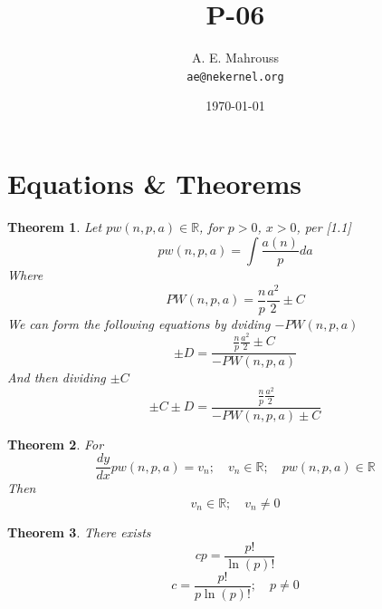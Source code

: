 \documentclass[11pt, a4paper]{article}
\title{P-06}
\author{A. E. Mahrouss\\\texttt{ae@nekernel.org}}
\date{\today}
\theoremstyle{plain}
\newtheorem{theorem}{Theorem}[section]
\theoremstyle{definition}
\theoremstyle{remark}
\begin{document}
\twocolumn[{%
  \maketitle
  \vspace{-0.5em}
  \vspace{0.8em}
  \rule{\linewidth}{0.4pt}
  \vspace{1em}
}]

\maketitle

\section{Equations \& Theorems}

\begin{theorem}
  Let $pw(n, p, a) \in \mathbb{R}$, for $p > 0$, $x > 0$, per [1.1]
  \begin{equation}
    pw(n, p, a) = \int \frac{a(n)}{p} da
  \end{equation}
  Where
  \begin{equation}
    PW(n, p, a) = \frac{n}{p} \frac{a^2}{2}\pm C
  \end{equation}
  We can form the following equations by dviding $-PW(n, p, a)$
  \begin{equation}
    \pm D = \frac{\frac{n}{p} \frac{a^2}{2}\pm C}{-PW(n, p, a)}
  \end{equation}
  And then dividing $\pm C$
  \begin{equation}
    \pm C \pm D = \frac{\frac{n}{p} \frac{a^2}{2}}{-PW(n, p, a)\pm C}
  \end{equation}
\end{theorem}

\begin{theorem}
  For
  \begin{equation}
    \frac{dy}{dx}pw(n, p, a) = v_{n}; \quad v_{n} \in \mathbb{R}; \quad pw(n, p, a) \in \mathbb{R}
  \end{equation}
  Then
  \begin{equation}
    v_{n} \in \mathbb{R}; \quad v_{n}\neq 0
  \end{equation}
\end{theorem}

\begin{theorem}
  There exists
  \begin{equation}
    cp = \frac{p!}{\ln \left(p\right)!}
  \end{equation}
  \begin{equation}
    c = \frac{p!}{p\ln \left(p\right)!}; \quad p \neq 0
  \end{equation}
\end{theorem}
\end{document}
